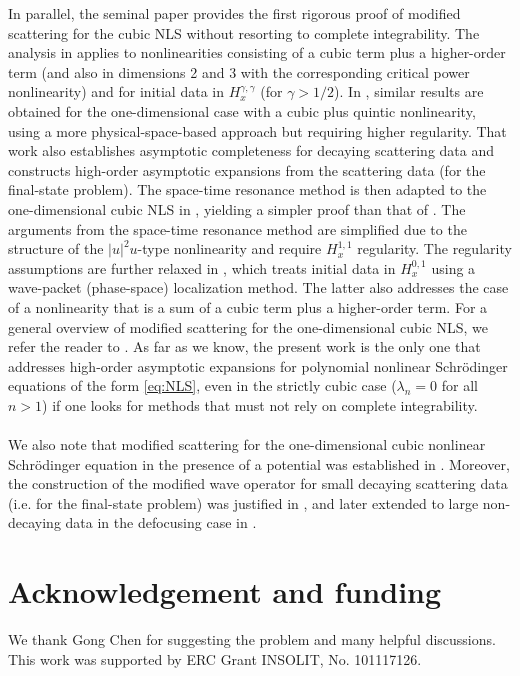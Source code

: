 \documentclass[a4paper, 15pt]{article}
\numberwithin{equation}{section}
\begin{document}
In parallel, the seminal paper \cite{zbMATH01192427} provides the first rigorous proof of modified scattering for the cubic NLS without resorting to complete integrability. The analysis in  \cite{zbMATH01192427} applies to nonlinearities consisting of a cubic term plus a higher-order term (and also in dimensions 2 and 3 with the corresponding critical power nonlinearity) and for initial data in $H^{\gamma,\gamma}_x$ (for $\gamma>1/2$). In \cite{zbMATH05036894}, similar results are obtained for the one-dimensional case with a cubic plus quintic nonlinearity, using a more physical-space-based approach but requiring higher regularity. That work also establishes asymptotic completeness for decaying scattering data and constructs high-order asymptotic expansions from the scattering data (for the final-state problem). The space-time resonance method is then adapted to the one-dimensional cubic NLS in \cite{zbMATH06033880}, yielding a simpler proof than that of \cite{zbMATH01192427}. The arguments from the space-time resonance method are simplified due to the structure of the $|u|^2u$-type nonlinearity and require $H^{1,1}_x$ regularity.  The regularity assumptions are further relaxed in \cite{zbMATH06502053}, which treats initial data in $H^{0,1}_x$
 using a wave-packet (phase-space) localization method. The latter also addresses the case of a nonlinearity that is a sum of a cubic term plus a higher-order term. For a general overview of modified scattering for the one-dimensional cubic NLS, we refer the reader to \cite{zbMATH07623540}. As far as we know, the present work is the only one that addresses high-order asymptotic expansions for polynomial nonlinear Schrödinger equations of the form \eqref{eq:NLS}, even in the strictly cubic case 
($\lambda_n=0$ for all $n>1$) if one looks for methods that must not rely on complete integrability.\\\\
We also note that modified scattering for the one-dimensional cubic nonlinear Schrödinger equation in the presence of a potential was established in \cite{zbMATH06931169,delort:hal-01396705,zbMATH06595439,chen20221dcubicnlsnongeneric,Chen_2022,chen2023longtimedynamicssmallsolutions}. Moreover, the construction of the modified wave operator for small decaying scattering data (i.e. for the final-state problem) was justified in \cite{zbMATH00027419}, and later extended to large non-decaying data in the defocusing case in \cite{arXiv:2506.01871}.
\section{Acknowledgement and funding} 
We thank Gong Chen for suggesting the problem and many helpful discussions.
This work was supported by ERC Grant INSOLIT, No. 101117126.
\tableofcontents
\end{document}
